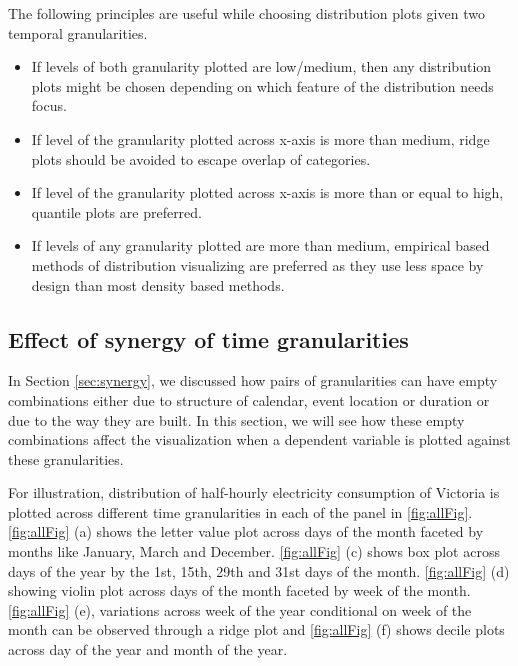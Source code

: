 \documentclass[12pt]{article}
\begin{document}
The following principles are useful while choosing distribution plots
given two temporal granularities.

\begin{itemize}
\item
  If levels of both granularity plotted are low/medium, then any
  distribution plots might be chosen depending on which feature of the
  distribution needs focus.
\item
  If level of the granularity plotted across x-axis is more than medium,
  ridge plots should be avoided to escape overlap of categories.
\item
  If level of the granularity plotted across x-axis is more than or
  equal to high, quantile plots are preferred.
\item
  If levels of any granularity plotted are more than medium, empirical
  based methods of distribution visualizing are preferred as they use
  less space by design than most density based methods.
\end{itemize}

\hypertarget{effect-of-synergy-of-time-granularities}{%
\subsection{Effect of synergy of time
granularities}\label{effect-of-synergy-of-time-granularities}}

In Section \ref{sec:synergy}, we discussed how pairs of granularities
can have empty combinations either due to structure of calendar, event
location or duration or due to the way they are built. In this section,
we will see how these empty combinations affect the visualization when a
dependent variable is plotted against these granularities.

For illustration, distribution of half-hourly electricity consumption of
Victoria is plotted across different time granularities in each of the
panel in \autoref{fig:allFig}. \autoref{fig:allFig} (a) shows the letter
value plot across days of the month faceted by months like January,
March and December. \autoref{fig:allFig} (c) shows box plot across days
of the year by the 1st, 15th, 29th and 31st days of the month.
\autoref{fig:allFig} (d) showing violin plot across days of the month
faceted by week of the month. \autoref{fig:allFig} (e), variations
across week of the year conditional on week of the month can be observed
through a ridge plot and \autoref{fig:allFig} (f) shows decile plots
across day of the year and month of the year.
\end{document}

